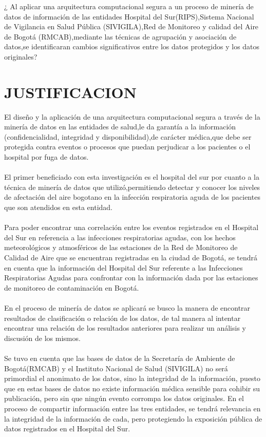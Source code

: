 \documentclass[a4paper,openright,12pt]{book}
\theoremstyle{definition}
\theoremstyle{remark}
\begin{document}
¿ Al aplicar una arquitectura computacional segura a un proceso de minería de datos de información de las entidades Hospital del Sur(RIPS),Sistema Nacional de Vigilancia en Salud Pública (SIVIGILA),Red de Monitoreo y calidad del Aire de Bogotá (RMCAB),mediante las técnicas de agrupación y asociación de datos,se identificaran cambios significativos entre los datos protegidos y los datos originales?

\section{JUSTIFICACION}
El diseño y la aplicación de una arquitectura computacional segura a través de la minería de datos en las entidades de salud,le da garantía a la información (confidencialidad, integridad y disponibilidad),de carácter médica,que debe ser protegida contra eventos o procesos que puedan perjudicar a los pacientes o el hospital por fuga de datos.\\\\
El primer beneficiado con esta investigación es el hospital del sur por cuanto a la técnica de minería de datos que utilizó,permitiendo detectar y conocer los niveles de afectación del aire bogotano en la infección respiratoria aguda de los pacientes que son atendidos en esta entidad.\\\\
Para  poder encontrar una correlación entre los eventos registrados en el Hospital del Sur en referencia a las infecciones respiratorias agudas, con los hechos meteorológicos y atmosféricos de las estaciones de la Red de Monitoreo de Calidad de Aire que se encuentran registradas en la ciudad de Bogotá, se tendrá en cuenta que la información del Hospital del Sur referente a las Infecciones Respiratorias Agudas para confrontar con la información dada por las estaciones de monitoreo de contaminación en Bogotá.\\\\
En el proceso de minería de datos se aplicará se busco la manera de encontrar resultados de clasificación o relación de los datos, de tal manera al intentar encontrar una relación de los resultados anteriores para realizar un análisis y discusión de los mismos.\\\\
Se tuvo en cuenta que las bases de datos de la Secretaría de Ambiente de Bogotá(RMCAB) y el Instituto Nacional de Salud (SIVIGILA) no será primordial el anonimato de los datos, sino la integridad de la información, puesto que en estas bases de datos no existe información médica sensible para cohibir su publicación, pero sin que ningún evento corrompa los datos originales. En el proceso de compartir información entre las tres entidades, se tendrá relevancia en la integridad de la información de cada, pero protegiendo la exposición pública de datos registrados en el Hospital del Sur.\\\\
\end{document}

